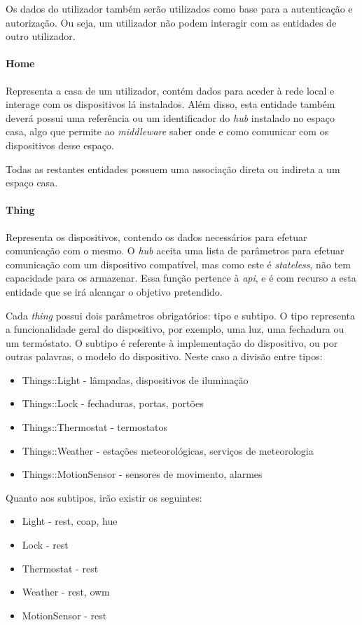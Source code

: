 Os dados do utilizador também serão utilizados como base para a autenticação e autorização. Ou seja, um utilizador não podem interagir com as entidades de outro utilizador.

\paragraph*{Home}
Representa a casa de um utilizador, contém dados para aceder à rede local e interage com os dispositivos lá instalados. Além disso, esta entidade também deverá possui uma referência ou um identificador do \textit{hub} instalado no espaço casa, algo que permite ao \textit{middleware} saber onde e como comunicar com os dispositivos desse espaço.

Todas as restantes entidades possuem uma associação direta ou indireta a um espaço casa.

\paragraph*{Thing} 
Representa os dispositivos, contendo os dados necessários para efetuar comunicação com o mesmo. O \textit{hub} aceita uma lista de parâmetros para efetuar comunicação com um dispositivo compatível, mas como este é \textit{stateless}, não tem capacidade para os armazenar. Essa função pertence à \textit{api}, e é com recurso a esta entidade que se irá alcançar o objetivo pretendido.

Cada \textit{thing} possui dois parâmetros obrigatórios: tipo e subtipo. O tipo representa a funcionalidade geral do dispositivo, por exemplo, uma luz, uma fechadura ou um termóstato. O subtipo é referente à implementação do dispositivo, ou por outras palavras, o modelo do dispositivo. Neste caso a divisão entre tipos:

\begin{itemize}
    \item Things::Light - lâmpadas, dispositivos de iluminação
    \item Things::Lock - fechaduras, portas, portões
    \item Things::Thermostat - termostatos
    \item Things::Weather - estações meteorológicas, serviços de meteorologia
    \item Things::MotionSensor - sensores de movimento, alarmes
\end{itemize}

\newpage

Quanto aos subtipos, irão existir os seguintes:
\begin{itemize}
    \item Light - rest, coap, hue
    \item Lock - rest
    \item Thermostat - rest
    \item Weather - rest, owm
    \item MotionSensor - rest
\end{itemize}

